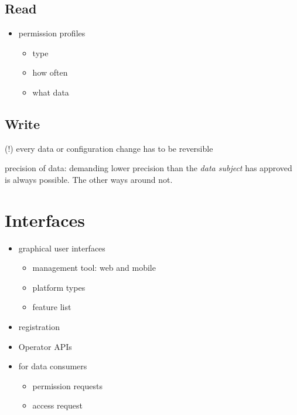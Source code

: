 \documentclass[12pt,english,a4paper,titlepage,cleardoublepage=empty,dottedtoc]{report}
\providecommand{\tightlist}{%
  \setlength{\itemsep}{0pt}\setlength{\parskip}{0pt}}
\begin{document}
\subsection{Read}\label{read}

\begin{itemize}
\tightlist
\item
  permission profiles

  \begin{itemize}
  \tightlist
  \item
    type
  \item
    how often
  \item
    what data
  \end{itemize}
\end{itemize}

\subsection{Write}\label{write}

(!) every data or configuration change has to be reversible

precision of data: demanding lower precision than the \emph{data
subject} has approved is always possible. The other ways around not.

\section{Interfaces}\label{interfaces-1}

\begin{itemize}
\tightlist
\item
  graphical user interfaces

  \begin{itemize}
  \tightlist
  \item
    management tool: web and mobile
  \item
    platform types
  \item
    feature list
  \end{itemize}
\item
  registration
\item
  Operator APIs
\item
  for data consumers

  \begin{itemize}
  \tightlist
  \item
    permission requests
  \item
    access request
  \end{itemize}
\end{itemize}
\end{document}

